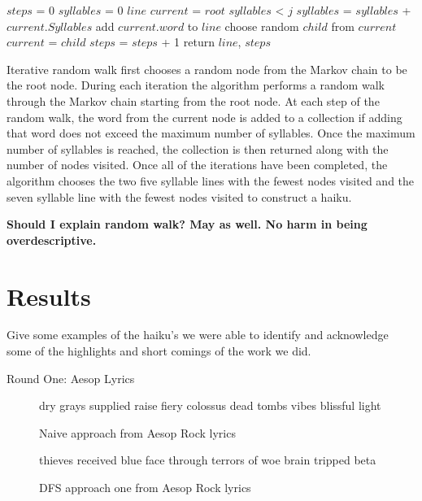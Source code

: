 \documentclass[]{article}
\newcommand{\comment}[1]
{\par {\bfseries \color{green} #1 \par}}
\begin{document}
\begin{algorithm}[H]
	\caption{$RandomWalk(root, j)$} \label{RandomWalk}
	\begin{algorithmic}[1]
		\State $steps$ = 0
		\State $syllables$ = 0
		\State $line$
		\State $current$ = $root$
		\While $syllables$ < $j$
				$syllables$ = $syllables$ + $current.Syllables$
				\State add $current.word$ to $line$
			\EndIf
			\State choose random $child$ from $current$
			$current$ = $child$
			$steps$ = $steps$ + 1
		\EndWhile
		\State return $line$, $steps$
	\end{algorithmic}
\end{algorithm}

Iterative random walk first chooses a random node from the Markov chain to be the root node. During each iteration the algorithm performs a random walk through the Markov chain starting from the root node. At each step of the random walk, the word from the current node is added to a collection if adding that word does not exceed the maximum number of syllables. Once the maximum number of syllables is reached, the collection is then returned along with the number of nodes visited. Once all of the iterations have been completed, the algorithm chooses the two five syllable lines with the fewest nodes visited and the seven syllable line with the fewest nodes visited to construct a haiku. 

\comment{Should I explain random walk? May as well. No harm in being overdescriptive.}

\section{Results}
Give some examples of the haiku's we were able to identify and acknowledge some of the highlights and short comings of the work we did.

Round One: Aesop Lyrics

\begin{figure}[H]
	\centering
	dry grays supplied raise \break
	fiery colossus dead tombs \break
	vibes blissful light
	\caption{Naive approach from Aesop Rock lyrics}
	\label{fig:NaiveAesop}
\end{figure}

\begin{figure}[H]
	\centering
	thieves received \break
	blue face through terrors of woe \break
	brain tripped beta
	\caption{DFS approach one from Aesop Rock lyrics}
	\label{fig:DFSOneAesop}
\end{figure}
\end{document}
